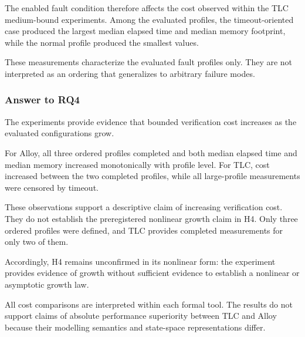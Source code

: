 The enabled fault condition therefore affects the cost observed within
the TLC medium-bound experiments. Among the evaluated profiles, the
timeout-oriented case produced the largest median elapsed time and
median memory footprint, while the normal profile produced the
smallest values.

These measurements characterize the evaluated fault profiles only.
They are not interpreted as an ordering that generalizes to arbitrary
failure modes.

\subsubsection{Answer to RQ4}
\label{subsubsec:rq4-answer}

The experiments provide evidence that bounded verification cost
increases as the evaluated configurations grow.

For Alloy, all three ordered profiles completed and both median elapsed
time and median memory increased monotonically with profile level.
For TLC, cost increased between the two completed profiles, while all
large-profile measurements were censored by timeout.

These observations support a descriptive claim of increasing
verification cost. They do not establish the preregistered nonlinear
growth claim in H4. Only three ordered profiles were defined, and TLC
provides completed measurements for only two of them.

Accordingly, H4 remains unconfirmed in its nonlinear form: the
experiment provides evidence of growth without sufficient evidence to
establish a nonlinear or asymptotic growth law.

All cost comparisons are interpreted within each formal tool. The
results do not support claims of absolute performance superiority
between TLC and Alloy because their modelling semantics and
state-space representations differ.
